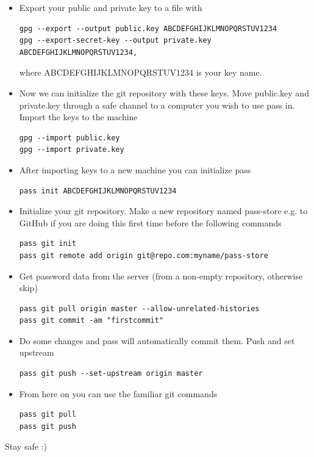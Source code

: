 \documentclass{article}
\begin{document}
\begin{itemize}
\item Export your public and private key to a file with \\
  \begin{verbatim}
gpg --export --output public.key ABCDEFGHIJKLMNOPQRSTUV1234 
gpg --export-secret-key --output private.key ABCDEFGHIJKLMNOPQRSTUV1234,
  \end{verbatim}
  where ABCDEFGHIJKLMNOPQRSTUV1234 is your key name.\\
\item Now we can initialize the git repository with these keys. Move public.key and private.key through a safe channel to a computer you wish to use pass in. Import the keys to the machine \\
\begin{verbatim}
gpg --import public.key
gpg --import private.key
\end{verbatim}
\item After importing keys to a new machine you can initialize pass
\begin{verbatim}
pass init ABCDEFGHIJKLMNOPQRSTUV1234
\end{verbatim}

\item Initialize your git repository. Make a new repository named pass-store e.g. to GitHub if you are doing this first time before the following commands\\
\begin{verbatim}
pass git init 
pass git remote add origin git@repo.com:myname/pass-store
 \end{verbatim}
\item Get password data from the server (from a non-empty repository, otherwise skip)
\begin{verbatim}
pass git pull origin master --allow-unrelated-histories
pass git commit -am "firstcommit"
\end{verbatim}
\item Do some changes and pass will automatically commit them. Push and set upstream \\
\begin{verbatim}
pass git push --set-upstream origin master 
\end{verbatim}
\item From here on you can use the familiar git commands \\
\begin{verbatim}
pass git pull 
pass git push 
\end{verbatim}
\end{itemize}
Stay safe :)
\end{document}
